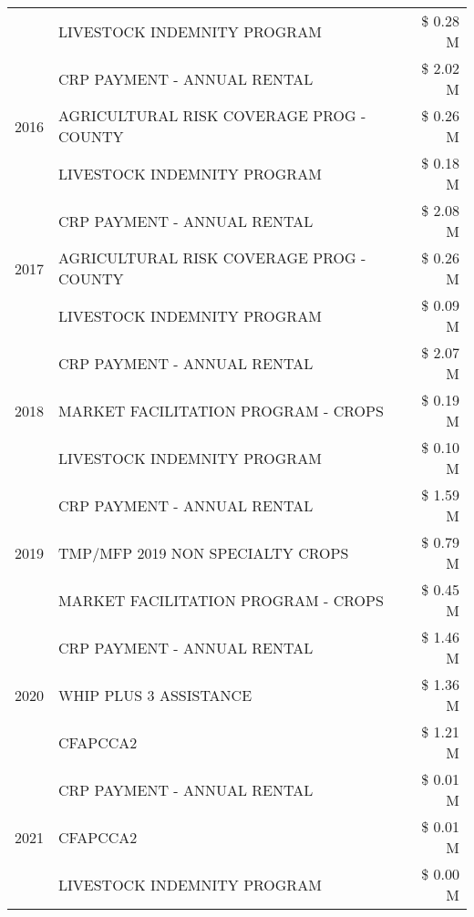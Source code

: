 \begin{tabular}{llr}
 & LIVESTOCK INDEMNITY PROGRAM & \$ 0.28 M \\
\cline{1-3}
\multirow[t]{3}{*}{2016} & CRP PAYMENT - ANNUAL RENTAL & \$ 2.02 M \\
 & AGRICULTURAL RISK COVERAGE PROG - COUNTY & \$ 0.26 M \\
 & LIVESTOCK INDEMNITY PROGRAM & \$ 0.18 M \\
\cline{1-3}
\multirow[t]{3}{*}{2017} & CRP PAYMENT - ANNUAL RENTAL & \$ 2.08 M \\
 & AGRICULTURAL RISK COVERAGE PROG - COUNTY & \$ 0.26 M \\
 & LIVESTOCK INDEMNITY PROGRAM & \$ 0.09 M \\
\cline{1-3}
\multirow[t]{3}{*}{2018} & CRP PAYMENT - ANNUAL RENTAL & \$ 2.07 M \\
 & MARKET FACILITATION PROGRAM - CROPS & \$ 0.19 M \\
 & LIVESTOCK INDEMNITY PROGRAM & \$ 0.10 M \\
\cline{1-3}
\multirow[t]{3}{*}{2019} & CRP PAYMENT - ANNUAL RENTAL & \$ 1.59 M \\
 & TMP/MFP 2019 NON SPECIALTY CROPS & \$ 0.79 M \\
 & MARKET FACILITATION PROGRAM - CROPS & \$ 0.45 M \\
\cline{1-3}
\multirow[t]{3}{*}{2020} & CRP PAYMENT - ANNUAL RENTAL & \$ 1.46 M \\
 & WHIP PLUS 3 ASSISTANCE & \$ 1.36 M \\
 & CFAPCCA2 & \$ 1.21 M \\
\cline{1-3}
\multirow[t]{3}{*}{2021} & CRP PAYMENT - ANNUAL RENTAL & \$ 0.01 M \\
 & CFAPCCA2 & \$ 0.01 M \\
 & LIVESTOCK INDEMNITY PROGRAM & \$ 0.00 M \\
\cline{1-3}
\bottomrule
\end{tabular}
